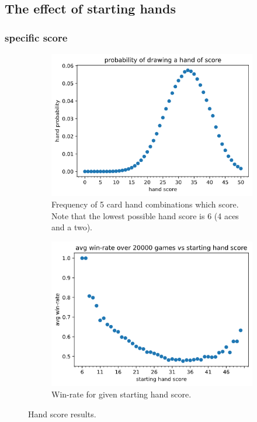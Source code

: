 \documentclass[../main.tex]{subfiles}
\begin{document}
\subsection{The effect of starting hands}

\subsubsection{specific score}

\begin{figure}
    \centering
    \begin{subfigure}[t]{0.49\textwidth}
        \centering
        \includegraphics[width=\textwidth,keepaspectratio]{images/results/handscores.png}
        \caption{Frequency of 5 card hand combinations which score. Note that the lowest possible hand score is 6 (4 aces and a two).}
        \label{fig:startinghand-probs}
    \end{subfigure}
    \hfill
    \begin{subfigure}[t]{0.49\textwidth}
        \centering
        \includegraphics[width=\textwidth,keepaspectratio]{images/results/winrate_handscore.png}
        \caption{Win-rate for given starting hand score.}
        \label{fig:startinghand-winrates}
    \end{subfigure}
    \caption{Hand score results.}
    \label{fig:handscores}
\end{figure}
\end{document}
